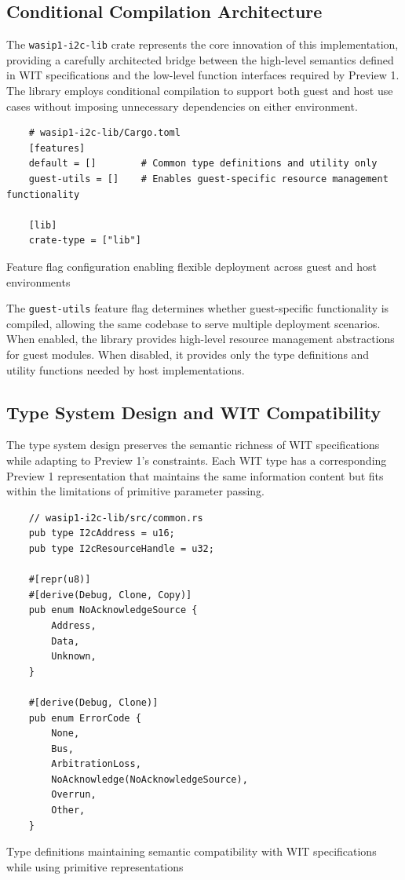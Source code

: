 \subsection{Conditional Compilation Architecture}

The \texttt{wasip1-i2c-lib} crate represents the core innovation of this implementation, providing a carefully architected bridge between the high-level semantics defined in WIT specifications and the low-level function interfaces required by Preview 1. The library employs conditional compilation to support both guest and host use cases without imposing unnecessary dependencies on either environment.

\begin{listing}[H]
    \begin{verbatim}
    # wasip1-i2c-lib/Cargo.toml
    [features]
    default = []        # Common type definitions and utility only
    guest-utils = []    # Enables guest-specific resource management functionality
    
    [lib]
    crate-type = ["lib"]
    \end{verbatim}
    \caption{Feature flag configuration enabling flexible deployment across guest and host environments}
    \label{lst:conditional-compilation}
\end{listing}

The \texttt{guest-utils} feature flag determines whether guest-specific functionality is compiled, allowing the same codebase to serve multiple deployment scenarios. When enabled, the library provides high-level resource management abstractions for guest modules. When disabled, it provides only the type definitions and utility functions needed by host implementations.

\subsection{Type System Design and WIT Compatibility}

The type system design preserves the semantic richness of WIT specifications while adapting to Preview 1's constraints. Each WIT type has a corresponding Preview 1 representation that maintains the same information content but fits within the limitations of primitive parameter passing.

\begin{listing}[H]
    \begin{verbatim}
    // wasip1-i2c-lib/src/common.rs
    pub type I2cAddress = u16;
    pub type I2cResourceHandle = u32;
    
    #[repr(u8)]
    #[derive(Debug, Clone, Copy)]
    pub enum NoAcknowledgeSource {
        Address,
        Data,
        Unknown,
    }
    
    #[derive(Debug, Clone)]
    pub enum ErrorCode {
        None,
        Bus,
        ArbitrationLoss,
        NoAcknowledge(NoAcknowledgeSource),
        Overrun,
        Other,
    }
    \end{verbatim}
    \caption{Type definitions maintaining semantic compatibility with WIT specifications while using primitive representations}
    \label{lst:type-definitions}
\end{listing}

